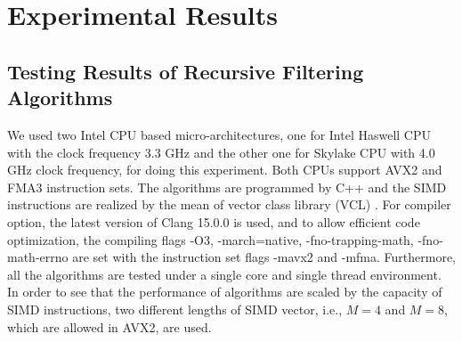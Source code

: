 \section{Experimental Results}
\label{sec:experiment}

\subsection{Testing Results of Recursive Filtering Algorithms}

We used two Intel CPU based micro-architectures, one for Intel Haswell CPU with the clock frequency 3.3 GHz
and the other one for Skylake CPU with 4.0 GHz clock frequency, for doing this experiment.
Both CPUs support AVX2 and FMA3 instruction sets. 
The algorithms are programmed by C++ and the SIMD instructions are realized
by the mean of vector class library (VCL) \cite{Agner_04}.
For compiler option, the latest version of Clang 15.0.0
is used, and to allow efficient code optimization, 
the compiling flags -O3, -march=native, -fno-trapping-math, -fno-math-errno are set with the instruction set flags -mavx2 and -mfma. 
Furthermore, all the algorithms are tested under a single core and single thread environment.
In order to see that the performance of algorithms are scaled by the capacity of SIMD instructions, two 
different lengths of SIMD vector, i.e., $M=4$ and $M=8$, which are allowed in AVX2, are used. 

